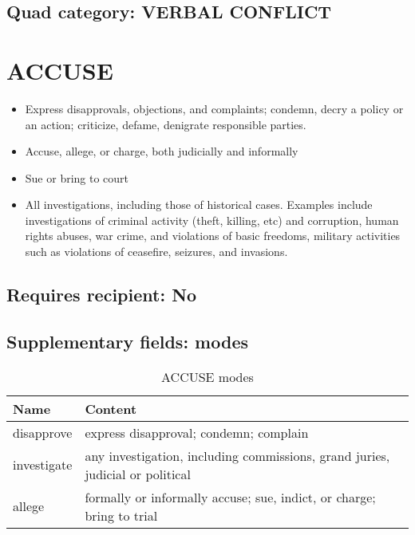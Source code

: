 \documentclass[11pt]{report}
\newcommand{\plcat}[1]{\textsf{#1}}
\begin{document}
 
\subsection{Quad category: VERBAL CONFLICT}

\newpage  


\section{ACCUSE}

\begin{itemize}
	\item Express disapprovals, objections, and complaints; condemn, decry a policy or an action; criticize, defame, denigrate responsible parties.
	\item Accuse, allege, or charge, both judicially and informally
	\item Sue or bring to court
	\item All investigations, including those of historical cases. Examples include investigations of  criminal activity (theft, killing, etc) and corruption, human rights abuses, war crime, and violations of basic freedoms, military activities such as violations of ceasefire, seizures, and invasions.
\end{itemize}


\subsection{Requires recipient: No}

\subsection{Supplementary fields: modes}

\begin{table}[htp]
\caption{\plcat{ACCUSE} modes}
\begin{center}
\begin{tabular}{|l|p{13cm}|}
\hline
Name & Content \\
\hline
disapprove & express disapproval; condemn; complain\\
investigate & any investigation, including commissions, grand juries, judicial or political\\
allege & formally or informally accuse; sue, indict, or charge; bring to trial\\
\hline
\end{tabular}
\end{center}
\label{tab:accusemode}
\end{table}%
\end{document}
